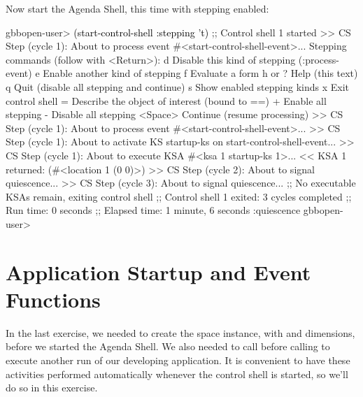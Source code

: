 \documentclass[10pt,twoside,english,pdftex]{article}
\begin{document}
%
%
Now start the Agenda Shell, this time with stepping enabled:
%
\W\supp
\begin{example}
\textcolor{darkergray}{%
  gbbopen-user> \textcolor{black}{(start-control-shell :stepping 't)}
  ;; Control shell 1 started
  >> CS Step (cycle 1):
     About to process event #<start-control-shell-event>... 
  Stepping commands (follow with <Return>):
     d       Disable this kind of stepping (:process-event)
     e       Enable another kind of stepping
     f       Evaluate a form
     h or ?  Help (this text)
     q       Quit (disable all stepping and continue)
     s       Show enabled stepping kinds
     x       Exit control shell
     =       Describe the object of interest (bound to ==)
     +       Enable all stepping
     -       Disable all stepping
     <Space> Continue (resume processing)
  >> CS Step (cycle 1):
     About to process event #<start-control-shell-event>... 
  >> CS Step (cycle 1):
     About to activate KS startup-ks on
       start-control-shell-event... 
  >> CS Step (cycle 1):
     About to execute KSA #<ksa 1 startup-ks 1>... 
  << KSA 1 returned: (#<location 1 (0 0)>)
  >> CS Step (cycle 2):
     About to signal quiescence... 
  >> CS Step (cycle 3):
     About to signal quiescence... 
  ;; No executable KSAs remain, exiting control shell
  ;; Control shell 1 exited: 3 cycles completed
  ;; Run time: 0 seconds
  ;; Elapsed time: 1 minute, 6 seconds
  :quiescence
  gbbopen-user>}
\end{example}


\T\markright{}%
\T\pagestyle{plain}
\T\cleardoublepage
\W{}
\T\pagestyle{fancy}
\T\thispagestyle{fancybottom}
\T\renewcommand{\headrulewidth}{0pt}
\section{Application Startup and Event Functions}
\label{sec:application-startup}%

In the last exercise, we needed to create the  space
instance, with  and  dimensions, before we started the Agenda
Shell.  We also needed to call 
before calling  to execute another run of
our developing application.  It is convenient to have these activities
performed automatically whenever the control shell is started, so we'll do so
in this exercise.
\end{document}
